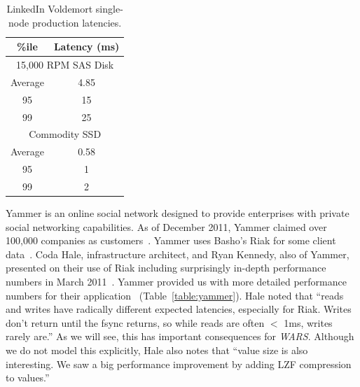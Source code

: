 \documentclass{vldb}
\begin{document}
\begin{table}
\centering
\begin{tabular}{|c|c|}
\hline
\%ile & Latency (ms) \\
\hline
\multicolumn{2}{|c|}{ 15,000 RPM SAS Disk}\\
\hline
Average & 4.85\\
95 & 15\\
99 & 25\\
\hline
\multicolumn{2}{|c|}{ Commodity SSD }\\
\hline
Average & 0.58 \\
95 & 1\\
99 & 2\\
\hline
\end{tabular}
\vspace{-6pt}
\caption{LinkedIn Voldemort single-node production latencies.}
\vspace{-12pt}
\label{table:linkedin}
\end{table}

Yammer is an online social network designed to provide enterprises
with private social networking capabilities.  As of December 2011,
Yammer claimed over 100,000 companies as customers~\cite{yammer}.
Yammer uses Basho's Riak for some client data~\cite{riak}.  Coda Hale,
infrastructure architect, and Ryan Kennedy, also of Yammer, presented
on their use of Riak including surprisingly in-depth performance
numbers in March 2011~\cite{riakyammer}.  Yammer provided us with more
detailed performance numbers for their application~\cite{codapc}
(Table~\ref{table:yammer}).  Hale noted that ``reads and writes have
radically different expected latencies, especially for Riak. Writes
don't return until the fsync returns, so while reads are often $<$
1ms, writes rarely are.''  As we will see, this has important
consequences for \textit{WARS}.  Although we do not model this
explicitly, Hale also notes that ``value size is also interesting. We
saw a big performance improvement by adding LZF compression to
values.''
\end{document}
